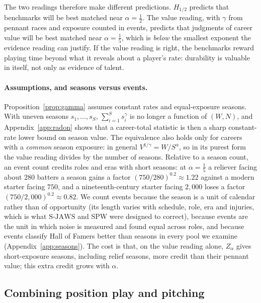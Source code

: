 \documentclass[11pt,letterpaper]{article}
\theoremstyle{plain}
\theoremstyle{definition}
\theoremstyle{remark}
\newcommand{\SJAWS}{\mathrm{S\text{-}JAWS}}
\begin{document}
The two readings therefore make different predictions. $H_{1/2}$ predicts that benchmarks will be best matched near $\alpha = \tfrac12$. The value reading, with $\gamma$ from pennant races and exposure counted in events, predicts that judgments of career value will be best matched near $\alpha = \tfrac15$, which is \emph{below} the smallest exponent the evidence reading can justify. If the value reading is right, the benchmarks reward playing time beyond what it reveals about a player's rate: durability is valuable in itself, not only as evidence of talent.

\paragraph{Assumptions, and seasons versus events.} Proposition~\ref{prop:gamma} assumes constant rates and equal-exposure seasons. With uneven seasons $s_1, \dots, s_S$, $\sum_{i=1}^S s_i^{\gamma}$ is no longer a function of $(W, N)$, and Appendix~\ref{app:radon} shows that a career-total statistic is then a sharp constant-rate lower bound on season value. The equivalence also holds only for careers with a \emph{common} season exposure: in general $V^{1/\gamma} = W/S^{\alpha}$, so in its purest form the value reading divides by the number of seasons. Relative to a season count, an event count credits roles and eras with short seasons: at $\alpha = \tfrac15$ a reliever facing about $280$ batters a season gains a factor $(750/280)^{0.2} \approx 1.22$ against a modern starter facing $750$, and a nineteenth-century starter facing $2{,}000$ loses a factor $(750/2{,}000)^{0.2} \approx 0.82$. We count events because the season is a unit of calendar rather than of opportunity (its length varies with schedule, role, era and injuries, which is what $\SJAWS$ and SPW were designed to correct), because events are the unit in which noise is measured and found equal across roles, and because events classify Hall of Famers better than seasons in every pool we examine (Appendix~\ref{app:seasons}). The cost is that, on the value reading alone, $Z_\alpha$ gives short-exposure seasons, including relief seasons, more credit than their pennant value; this extra credit grows with $\alpha$.

\subsection{Combining position play and pitching}
\label{sec:twoway_theory}
\end{document}
